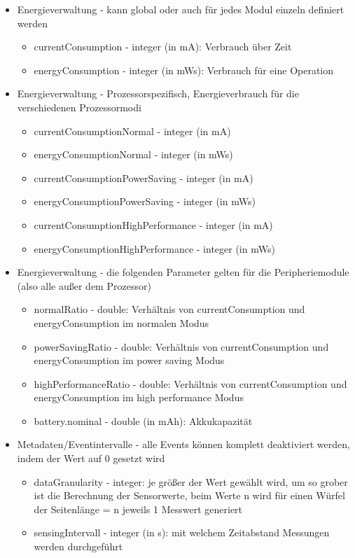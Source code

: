 \begin{itemize}
\item Energieverwaltung - kann global oder auch für jedes Modul einzeln definiert werden
\begin{itemize}
\item currentConsumption - integer (in mA): Verbrauch über Zeit
\item energyConsumption - integer (in mWs): Verbrauch für eine Operation
\end{itemize}
\item Energieverwaltung - Prozessorspezifisch, Energieverbrauch für die verschiedenen Prozessormodi
\begin{itemize}
\item currentConsumptionNormal - integer (in mA)
\item energyConsumptionNormal - integer (in mWs)
\item currentConsumptionPowerSaving - integer (in mA)
\item energyConsumptionPowerSaving - integer (in mWs)
\item currentConsumptionHighPerformance - integer (in mA)
\item energyConsumptionHighPerformance - integer (in mWs)
\end{itemize}
\item Energieverwaltung - die folgenden Parameter gelten für die Peripheriemodule (also alle außer dem Prozessor)
\begin{itemize}
\item normalRatio - double: Verhältnis von currentConsumption und energyConsumption im normalen Modus
\item powerSavingRatio - double: Verhältnis von currentConsumption und energyConsumption im power saving Modus
\item highPerformanceRatio - double: Verhältnis von currentConsumption und energyConsumption im high performance Modus
\item battery.nominal - double (in mAh): Akkukapazität
\end{itemize}
\newpage
\item Metadaten/Eventintervalle - alle Events können komplett deaktiviert werden, indem der Wert auf 0 gesetzt wird
\begin{itemize}
\item dataGranularity - integer: je größer der Wert gewählt wird, um so grober ist die Berechnung der Sensorwerte, beim Werte n wird für einen Würfel der Seitenlänge = n jeweils 1 Messwert generiert
\item sensingIntervall - integer (in s): mit welchem Zeitabstand Messungen werden durchgeführt

\end{itemize}
\end{itemize}
